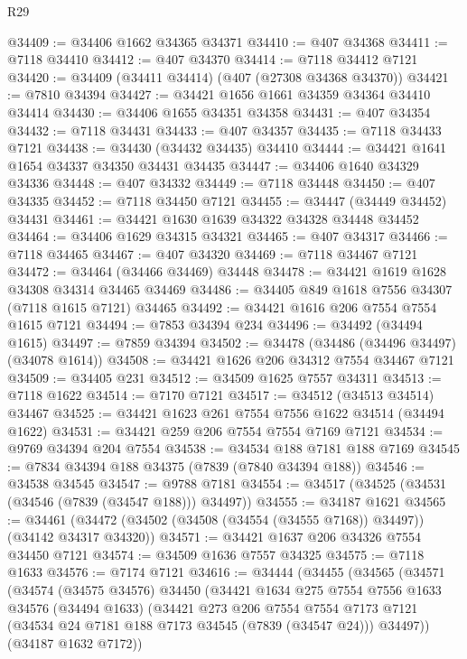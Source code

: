 \begin{lexlean}{R29}
\begin{coremodule}
@34409 := @34406 @1662 @34365 @34371
@34410 := @407 @34368
@34411 := @7118 @34410
@34412 := @407 @34370
@34414 := @7118 @34412 @7121
@34420 := @34409 (@34411 @34414) (@407 (@27308 @34368 @34370))
@34421 := @7810 @34394
@34427 := @34421 @1656 @1661 @34359 @34364 @34410 @34414
@34430 := @34406 @1655 @34351 @34358
@34431 := @407 @34354
@34432 := @7118 @34431
@34433 := @407 @34357
@34435 := @7118 @34433 @7121
@34438 := @34430 (@34432 @34435) @34410
@34444 := @34421 @1641 @1654 @34337 @34350 @34431 @34435
@34447 := @34406 @1640 @34329 @34336
@34448 := @407 @34332
@34449 := @7118 @34448
@34450 := @407 @34335
@34452 := @7118 @34450 @7121
@34455 := @34447 (@34449 @34452) @34431
@34461 := @34421 @1630 @1639 @34322 @34328 @34448 @34452
@34464 := @34406 @1629 @34315 @34321
@34465 := @407 @34317
@34466 := @7118 @34465
@34467 := @407 @34320
@34469 := @7118 @34467 @7121
@34472 := @34464 (@34466 @34469) @34448
@34478 := @34421 @1619 @1628 @34308 @34314 @34465 @34469
@34486 := @34405 @849 @1618 @7556 @34307 (@7118 @1615 @7121) @34465
@34492 := @34421 @1616 @206 @7554 @7554 @1615 @7121
@34494 := @7853 @34394 @234
@34496 := @34492 (@34494 @1615)
@34497 := @7859 @34394
@34502 := @34478 (@34486 (@34496 @34497) (@34078 @1614))
@34508 := @34421 @1626 @206 @34312 @7554 @34467 @7121
@34509 := @34405 @231
@34512 := @34509 @1625 @7557 @34311
@34513 := @7118 @1622
@34514 := @7170 @7121
@34517 := @34512 (@34513 @34514) @34467
@34525 := @34421 @1623 @261 @7554 @7556 @1622 @34514 (@34494 @1622)
@34531 := @34421 @259 @206 @7554 @7554 @7169 @7121
@34534 := @9769 @34394 @204 @7554
@34538 := @34534 @188 @7181 @188 @7169
@34545 := @7834 @34394 @188 @34375 (@7839 (@7840 @34394 @188))
@34546 := @34538 @34545
@34547 := @9788 @7181
@34554 := @34517 (@34525 (@34531 (@34546 (@7839 (@34547 @188))) @34497))
@34555 := @34187 @1621
@34565 := @34461 (@34472 (@34502 (@34508 (@34554 (@34555 @7168)) @34497)) (@34142 @34317 @34320))
@34571 := @34421 @1637 @206 @34326 @7554 @34450 @7121
@34574 := @34509 @1636 @7557 @34325
@34575 := @7118 @1633
@34576 := @7174 @7121
@34616 := @34444
    (@34455
      (@34565
        (@34571
          (@34574
            (@34575 @34576)
            @34450
            (@34421
              @1634
              @275
              @7554
              @7556
              @1633
              @34576
              (@34494 @1633)
              (@34421
                @273
                @206
                @7554
                @7554
                @7173
                @7121
                (@34534 @24 @7181 @188 @7173 @34545 (@7839 (@34547 @24)))
                @34497))
            (@34187 @1632 @7172))

\end{coremodule}
\end{lexlean}
